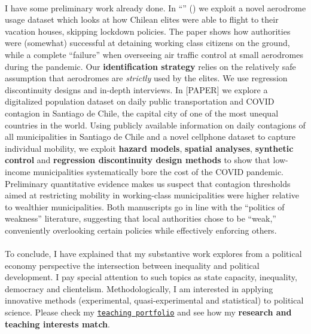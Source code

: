\documentclass[letterpaper]{article}
\begin{document}
\paragraph{}I have some preliminary work already done. In ``\href{https://raw.githubusercontent.com/hbahamonde/Tobalaba/master/abstract.txt}{{\unskip}}'' (\emph{\unskip}) we exploit a novel aerodrome usage dataset which looks at how Chilean elites were able to flight to their vacation houses, skipping lockdown policies. The paper shows how authorities were (somewhat) successful at detaining working class citizens on the ground, while a complete ``failure'' when overseeing air traffic control at small aerodromes during the pandemic. Our {\bf identification strategy} relies on the relatively safe assumption that aerodromes are \emph{strictly} used by the elites. We use regression discontinuity designs and in-depth interviews. In [PAPER]  we explore a digitalized population dataset on daily public transportation and COVID contagion in Santiago de Chile, the capital city of one of the most unequal countries in the world. Using publicly available information on daily contagions of all municipalities in Santiago de Chile and a novel cellphone dataset to capture individual mobility, we exploit {\bf hazard models}, {\bf spatial analyses}, {\bf synthetic control} and {\bf regression discontinuity design methods} to show that low-income municipalities systematically bore the cost of the COVID pandemic. Preliminary quantitative evidence makes us suspect that contagion thresholds aimed at restricting mobility in working-class municipalities were higher relative to wealthier municipalities. Both manuscripts go in line with the ``politics of weakness'' literature, suggesting that local authorities chose to be ``weak,'' conveniently overlooking certain policies while effectively enforcing others.

\paragraph{}To conclude, I have explained that my substantive work explores from a political economy perspective the intersection between inequality and political development. I pay special attention to such topics as state capacity, inequality, democracy and clientelism. Methodologically, I am interested in applying innovative methods (experimental, quasi-experimental and statistical) to political science. Please check my \href{http://www.hectorbahamonde.com/teaching/}{\texttt{teaching portfolio}} and see how my {\bf research and teaching interests match}. 

{\unskip}


\vspace{-10cm}


\end{document}
